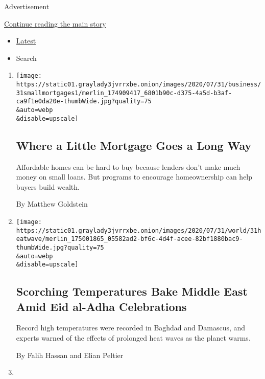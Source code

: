 Advertisement

\protect\hyperlink{after-mid1}{Continue reading the main story}

\begin{itemize}
\tightlist
\item
  \protect\hyperlink{stream-panel}{Latest}
\item
  Search
\end{itemize}

\begin{enumerate}
\def\labelenumi{\arabic{enumi}.}
\item
  \href{/2020/08/02/business/mortgages-affordable-housing.html}{}

  \texttt{[image: https://static01.graylady3jvrrxbe.onion/images/2020/07/31/business/31smallmortgages1/merlin\_174909417\_6801b90c-d375-4a5d-b3af-ca9f1e0da20e-thumbWide.jpg?quality=75\\\&auto=webp\\\&disable=upscale]}

  \hypertarget{where-a-little-mortgage-goes-a-long-way}{%
  \subsection{Where a Little Mortgage Goes a Long
  Way}\label{where-a-little-mortgage-goes-a-long-way}}

  Affordable homes can be hard to buy because lenders don't make much
  money on small loans. But programs to encourage homeownership can help
  buyers build wealth.

  By Matthew Goldstein
\item
  \href{/2020/07/31/world/middleeast/Middle-East-heat-wave.html}{}

  \texttt{[image: https://static01.graylady3jvrrxbe.onion/images/2020/07/31/world/31heatwave/merlin\_175001865\_05582ad2-bf6c-4d4f-acee-82bf1880bac9-thumbWide.jpg?quality=75\\\&auto=webp\\\&disable=upscale]}

  \hypertarget{scorching-temperatures-bake-middle-east-amid-eid-al-adha-celebrations}{%
  \subsection{Scorching Temperatures Bake Middle East Amid Eid al-Adha
  Celebrations}\label{scorching-temperatures-bake-middle-east-amid-eid-al-adha-celebrations}}

  Record high temperatures were recorded in Baghdad and Damascus, and
  experts warned of the effects of prolonged heat waves as the planet
  warms.

  By Falih Hassan and Elian Peltier
\item
  \href{/2020/07/29/climate/skating-hockey-climate-change.html}{}


\end{enumerate}
